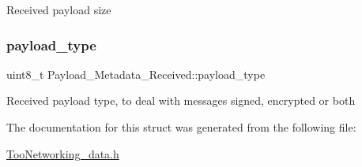 Received payload size \mbox{\label{structPayload__Metadata__Received_a0105d708c3cc157a95c3cf4068e290de}} 
\subsubsection{\texorpdfstring{payload\+\_\+type}{payload\_type}}
{\footnotesize\ttfamily uint8\+\_\+t Payload\+\_\+\+Metadata\+\_\+\+Received\+::payload\+\_\+type}

Received payload type, to deal with messages signed, encrypted or both 

The documentation for this struct was generated from the following file\+:\begin{DoxyCompactItemize}
\item 
\hyperlink{TooNetworking__data_8h}{Too\+Networking\+\_\+data.\+h}\end{DoxyCompactItemize}
